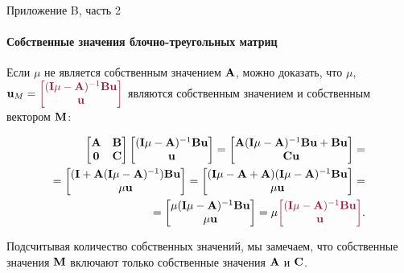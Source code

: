 \documentclass{beamer}
\begin{document}
\begin{frame}{Приложение B, часть 2}
	\framesubtitle{Собственные значения блочно-треугольных матриц}
	\begin{flushleft}
		
		Если $\mu$ не является собственным значением $\mathbf{A}$, можно доказать, что $\mu$, $\bo{u}_M = \textcolor{mydarkpink}{\begin{bmatrix}
				(\bo{I}\mu - \bo{A})^{-1} \bo{B} \bo{u}  \\  \bo{u} 
		\end{bmatrix}}$ являются собственным значением и собственным вектором $\mathbf{M}$:
		
		\begin{align*}
			\begin{bmatrix}
				\bo{A} & \bo{B} \\ \bo{0} & \bo{C}
			\end{bmatrix}
			\begin{bmatrix}
				(\bo{I}\mu - \bo{A})^{-1}\bo{B} \bo{u}  \\  \bo{u} 
			\end{bmatrix}
			=
			\begin{bmatrix}
				\bo{A}(\bo{I}\mu - \bo{A})^{-1}\bo{B} \bo{u} + \bo{B} \bo{u}
				\\ 
				\bo{C}\bo{u}
			\end{bmatrix}
			= \\
			=
			\begin{bmatrix}
				(\bo{I}+\bo{A}(\bo{I}\mu - \bo{A})^{-1}) \bo{B} \bo{u}
				\\ 
				\mu \bo{u}
			\end{bmatrix} 
			=
			\begin{bmatrix}
				(\bo{I}\mu - \bo{A}+\bo{A})(\bo{I}\mu - \bo{A})^{-1} \bo{B} \bo{u}
				\\ 
				\mu \bo{u}
			\end{bmatrix} 
			= \\
			=
			\begin{bmatrix}
				\mu(\bo{I}\mu - \bo{A})^{-1} \bo{B} \bo{u}
				\\ 
				\mu \bo{u}
			\end{bmatrix} 
			=
			\mu 
			\textcolor{mydarkpink}{
				\begin{bmatrix}
					(\bo{I}\mu - \bo{A})^{-1} \bo{B} \bo{u}
					\\ 
					\bo{u}
				\end{bmatrix} 
			}.
		\end{align*}	
		
		Подсчитывая количество собственных значений, мы замечаем, что собственные значения $\mathbf{M}$ включают только собственные значения $\mathbf{A}$ и $\mathbf{C}$.
		
	\end{flushleft}
\end{frame}
\end{document}
